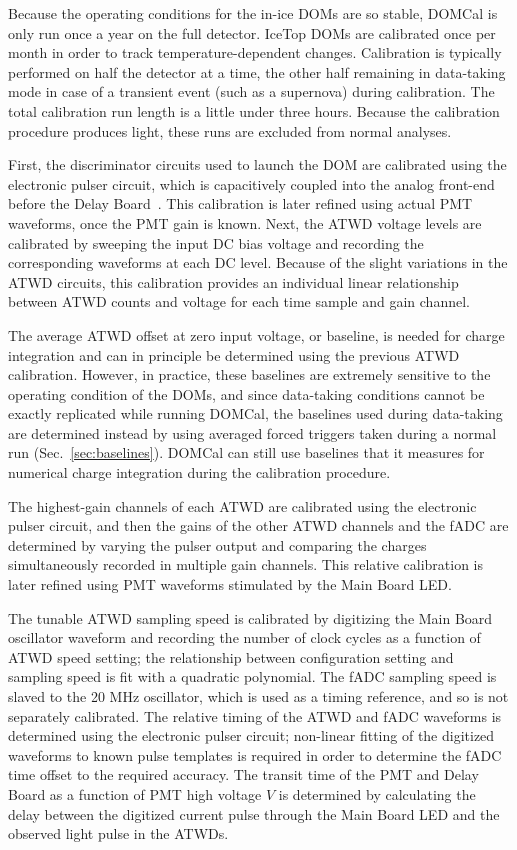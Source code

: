 Because the operating conditions for
the in-ice DOMs are so stable, DOMCal is only run once a year on the full
detector. IceTop DOMs are calibrated once per month in order to track
temperature-dependent changes.  Calibration is
typically performed on half the detector at a time, the other half
remaining in data-taking mode in case of a transient event (such as a
supernova) during calibration. The total calibration run length is a
little under three hours. Because the calibration procedure produces
light, these runs are excluded from normal analyses.

First, the discriminator circuits used to launch the DOM are calibrated
using the electronic pulser circuit, which is capacitively coupled into the
analog front-end before the Delay Board~\cite{ICECUBE:DAQ}.  This
calibration is later refined using actual 
PMT waveforms, once the PMT gain is known.  Next, the ATWD voltage levels
are calibrated by sweeping the input DC bias voltage and recording the
corresponding waveforms at each DC level.  Because of the slight variations in the ATWD circuits, this
calibration provides an individual linear relationship between ATWD counts
and voltage for each time sample and gain channel.

The average ATWD offset at zero input voltage, or baseline, is needed for
charge integration and can in principle be determined using the previous
ATWD calibration. However, in
practice, these baselines are extremely sensitive to the operating
condition of the DOMs, and since data-taking conditions cannot be exactly
replicated while running DOMCal, the baselines used during data-taking are
determined instead by using averaged forced triggers taken during a normal
run (Sec.~\ref{sec:baselines}).  DOMCal can still use baselines that it measures
for numerical charge integration during the calibration procedure.

The highest-gain channels of each ATWD are calibrated using the electronic
pulser circuit, and then the gains of the other ATWD channels and the fADC
are determined by varying the pulser output and comparing the charges
simultaneously recorded in multiple gain channels.  This relative
calibration is later refined using PMT waveforms stimulated by the Main
Board LED.

The tunable ATWD sampling speed is calibrated by digitizing the Main Board oscillator
waveform and recording the number of clock cycles as a function of ATWD
speed setting; the relationship between configuration setting and sampling
speed is fit with a quadratic polynomial.  The fADC sampling speed is
slaved to the 20 MHz oscillator, which is used as a timing reference, and
so is not separately calibrated.  The relative timing of 
the ATWD and fADC waveforms is determined using the electronic pulser circuit;
non-linear fitting of the digitized waveforms to known pulse templates is
required in order to determine the fADC time offset to the required accuracy.
The transit time of the PMT and Delay Board as a function of PMT high
voltage $V$ is determined by calculating the delay between the digitized
current pulse through the Main Board LED and the observed light pulse in
the ATWDs.

